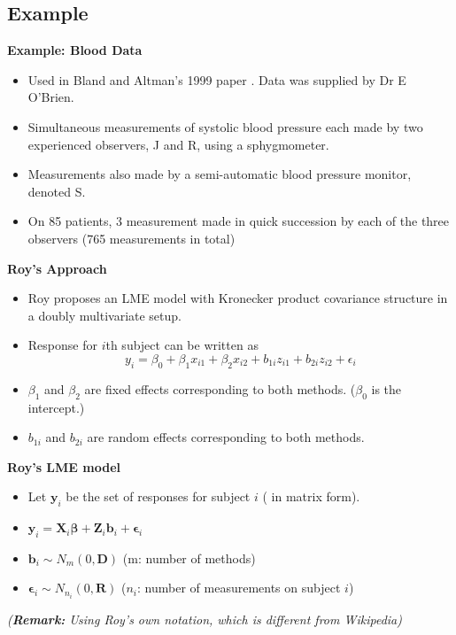 \documentclass[compress]{beamer}        %
\makeatletter
\newcommand{\tcb}{\textcolor{beamer@blendedblue}}
\makeatother
\begin{document}
		\subsection{Example}
		\begin{frame}{\bf \tcb{Example: Blood Data}}
			\begin{itemize}\itemsep0.7cm
				\item Used in Bland and Altman's 1999 paper \cite{BA99}. Data was supplied by Dr E O'Brien.
				\item Simultaneous measurements of systolic blood pressure each made by two experienced observers, J and R, using a  sphygmometer.
				\item Measurements also made by a semi-automatic blood pressure monitor, denoted S.
				\item On 85 patients, 3 measurement made in quick succession by each of the three observers (765 measurements in total)
			\end{itemize}
		\end{frame}
		\begin{frame}{\bf \tcb{Roy's Approach}}
						\large
			\begin{itemize}\itemsep0.7cm
				\item Roy proposes an LME model with Kronecker product covariance structure in a doubly multivariate setup.
				\item Response for $i$th subject can be written as
				\[ y_i = \beta_0 + \beta_1x_{i1} + \beta_2x_{i2} + b_{1i}z_{i1}  + b_{2i}z_{i2} + \epsilon_i \]
				\item $\beta_1$ and $\beta_2$ are fixed effects corresponding to both methods. ($\beta_0$ is the intercept.)
				\item $b_{1i}$ and $b_{2i}$ are random effects corresponding to both methods.
			\end{itemize}
		\end{frame}
		
		\begin{frame}{\bf \tcb{Roy's LME model}}
			\large
			\begin{itemize}\itemsep0.6cm
				
				\item Let $\boldsymbol{y}_i$ be the set of responses for subject $i$ ( in matrix form).
				\item $\boldsymbol{y}_i = \boldsymbol{X}_i\boldsymbol{\beta} + \boldsymbol{Z}_i \boldsymbol{b}_i + \boldsymbol{\epsilon}_i$
				\item $\boldsymbol{b}_i \sim N_m(0,\boldsymbol{D})$  (m: number of methods)
				\item $\boldsymbol{\epsilon}_i \sim N_{n_i}(0,\boldsymbol{R})$ ($n_i$: number of measurements on subject $i$)
			\end{itemize}
			\bigskip
\textit{(\textbf{Remark:} Using Roy's own notation, which is different from Wikipedia)}
		\end{frame}
		
\end{document}
